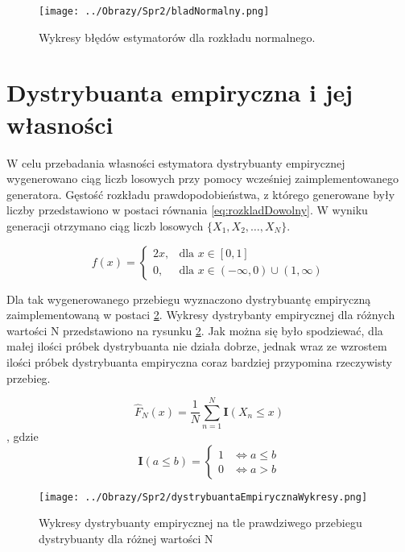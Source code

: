\documentclass[12pt,a4paper]{article}
\begin{document}
\begin{figure}[H]
\centering
\texttt{[image: ../Obrazy/Spr2/bladNormalny.png]} 
\caption{Wykresy błędów estymatorów dla rozkładu normalnego.}
\label{fig:bladNormalny}
\end{figure}

\section{Dystrybuanta empiryczna i jej własności}
W celu przebadania własności estymatora dystrybuanty empirycznej wygenerowano ciąg liczb losowych przy pomocy wcześniej zaimplementowanego generatora. 
Gęstość rozkładu prawdopodobieństwa, z którego generowane były liczby przedstawiono w postaci równania \ref{eq:rozkladDowolny}. 
W wyniku generacji otrzymano ciąg liczb losowych $\{X_{1},X_{2},\dots,X_{N}\}$.

\begin{equation}\label{eq:rozkladDowolny}
f(x) = \begin{cases} 2x, & \mbox{dla } x \in [0,1] \\ 0, & \mbox{dla } x \in (-\infty,0) \cup (1,\infty) \end{cases}
\end{equation}

Dla tak wygenerowanego przebiegu wyznaczono dystrybuantę empiryczną zaimplementowaną w postaci \ref{fig:dystrybuantaEmpiryczna}. Wykresy dystrybanty empirycznej dla różnych wartości N przedstawiono na rysunku \ref{fig:dystrybuantaEmpiryczna}.
Jak można się było spodziewać, dla małej ilości próbek dystrybuanta nie działa dobrze, jednak wraz ze wzrostem ilości próbek dystrybuanta empiryczna coraz bardziej przypomina rzeczywisty przebieg. 

\begin{equation}\label{eq:dystrybuantaEmpiryczna}
\hat{F}_{N}(x)=\frac{1}{N}\sum^{N}_{n=1}\textbf{I}(X_{n} \le x)
\end{equation}
, gdzie
\begin{equation}
\textbf{I}(a \le b) = \begin{cases} 1 &\iff a \le b \\ 0 &\iff a > b \end{cases} 
\end{equation}

\begin{figure}[H]
\centering
\texttt{[image: ../Obrazy/Spr2/dystrybuantaEmpirycznaWykresy.png]} 
\caption{Wykresy dystrybuanty empirycznej na tle prawdziwego przebiegu dystrybuanty dla różnej wartości N}
\label{fig:dystrybuantaEmpiryczna}
\end{figure}
\end{document}
